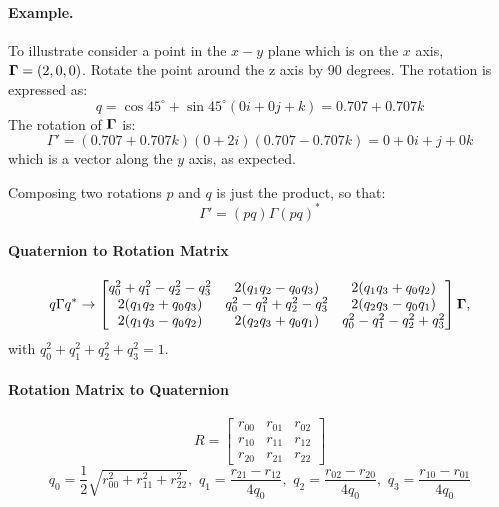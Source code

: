 \paragraph{Example.} 
To illustrate consider a point in the $x-y$ plane which is on the $x$ axis,
$\boldsymbol{\Gamma} = (2,0,0)$. Rotate the point around the z axis by 90 degrees. The
rotation is expressed as:
\begin{equation}
q = \cos 45^\circ + \sin 45^\circ (0i + 0j + k) = 0.707 + 0.707k
\end{equation}
The rotation of $\boldsymbol{\Gamma}$ is:
\begin{equation}
\Gamma' = (0.707 + 0.707k)(0 + 2i)(0.707 - 0.707k) = 0 + 0i + j + 0k
\end{equation}
which is a vector along the $y$ axis, as expected.

Composing two rotations $p$ and $q$ is just the product, so that:
\begin{equation}
\Gamma' = (pq)\Gamma(pq)^*
\end{equation}

\paragraph{Quaternion to Rotation Matrix}
\begin{equation}\label{eq:quaternion:to:rotation:matrix}
q\Gamma q^* \rightarrow
\begin{bmatrix}
q_0^2 + q_1^2 - q_2^2 - q_3^2 & 2(q_1q_2 - q_0q_3) & 2(q_1q_3 + q_0q_2)\\
2(q_1q_2+q_0q_3) & q_0^2 - q_1^2 + q_2^2 - q_3^2 & 2(q_2q_3 - q_0q_1)\\
2(q_1q_3 - q_0q_2) & 2(q_2q_3 + q_0q_1) & q_0^2 - q_1^2 -q_2^2 + q_3^2
\end{bmatrix}
\boldsymbol{\Gamma},
\end{equation}
with $q_0^2 + q_1^2 + q_2^2 + q_3^2 = 1$.

\paragraph{Rotation Matrix to Quaternion}
\begin{equation}
R = 
\begin{bmatrix}
r_{00} & r_{01} & r_{02}\\
r_{10} & r_{11} & r_{12}\\
r_{20} & r_{21} & r_{22}
\end{bmatrix}
\end{equation}
\begin{equation}
q_0 = \frac{1}{2}\sqrt{r_{00}^2 + r_{11}^2 + r_{22}^2},\,\,
q_1 = \frac{r_{21} - r_{12}}{4q_0},\,\,
q_2 = \frac{r_{02} - r_{20}}{4q_0},\,\,
q_3 = \frac{r_{10} - r_{01}}{4q_0}
\end{equation}

